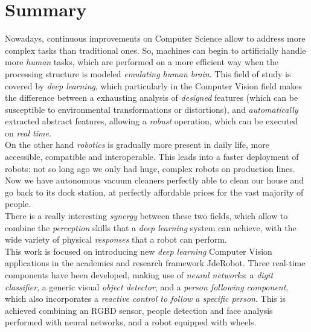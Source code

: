 \chapter*{Summary}
	Nowadays, continuous improvements on Computer Science allow to address more complex tasks than traditional ones. So, machines can begin to artificially handle more \emph{human} tasks, which are performed on a more efficient way when the processing structure is modeled \emph{emulating human brain}. This field of study is covered by \emph{deep learning}, which particularly in the Computer Vision field makes the difference between a exhausting analysis of \emph{designed} features (which can be susceptible to environmental transformations or distortions), and \emph{automatically} extracted abstract features, allowing a \emph{robust} operation, which can be executed on \emph{real time}.\\
	
	
	On the other hand \emph{robotics} is gradually more present in daily life, more accessible, compatible and interoperable. This leads into a faster deployment of robots: not so long ago we only had huge, complex robots on production lines. Now we have autonomous vacuum cleaners perfectly able to clean our house and go back to its dock station, at perfectly affordable prices for the vast majority of people.\\
	
	
	There is a really interesting \emph{synergy} between these two fields, which allow to combine the \emph{perception} skills that a \emph{deep learning} system can achieve, with the wide variety of physical \emph{responses} that a robot can perform.\\
	
	
	This work is focused on introducing new \emph{deep learning} Computer Vision applications in the academics and research framework JdeRobot. Three real-time components have been developed, making use of \emph{neural networks}: a \emph{digit classifier}, a generic visual \emph{object detector}, and a \emph{person following component}, which also incorporates a \emph{reactive control to follow a specific person}. This is achieved combining an RGBD sensor, people detection and face analysis performed with neural networks, and a robot equipped with wheels.